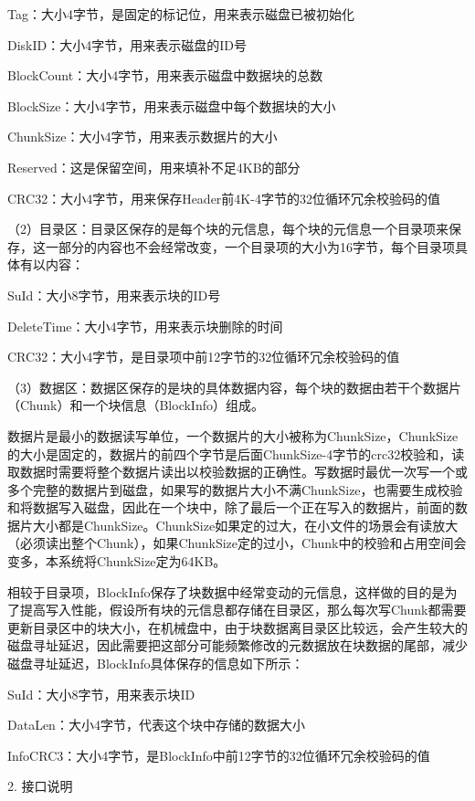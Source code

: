 Tag：大小4字节，是固定的标记位，用来表示磁盘已被初始化

DiskID：大小4字节，用来表示磁盘的ID号

BlockCount：大小4字节，用来表示磁盘中数据块的总数

BlockSize：大小4字节，用来表示磁盘中每个数据块的大小

ChunkSize：大小4字节，用来表示数据片的大小

Reserved：这是保留空间，用来填补不足4KB的部分

CRC32：大小4字节，用来保存Header前4K-4字节的32位循环冗余校验码的值

（2）目录区：目录区保存的是每个块的元信息，每个块的元信息一个目录项来保存，这一部分的内容也不会经常改变，一个目录项的大小为16字节，每个目录项具体有以内容：

SuId：大小8字节，用来表示块的ID号

DeleteTime：大小4字节，用来表示块删除的时间

CRC32：大小4字节，是目录项中前12字节的32位循环冗余校验码的值

（3）数据区：数据区保存的是块的具体数据内容，每个块的数据由若干个数据片（Chunk）和一个块信息（BlockInfo）组成。

数据片是最小的数据读写单位，一个数据片的大小被称为ChunkSize，ChunkSize的大小是固定的，数据片的前四个字节是后面ChunkSize-4字节的crc32校验和，读取数据时需要将整个数据片读出以校验数据的正确性。写数据时最优一次写一个或多个完整的数据片到磁盘，如果写的数据片大小不满ChunkSize，也需要生成校验和将数据写入磁盘，因此在一个块中，除了最后一个正在写入的数据片，前面的数据片大小都是ChunkSize。ChunkSize如果定的过大，在小文件的场景会有读放大（必须读出整个Chunk），如果ChunkSize定的过小，Chunk中的校验和占用空间会变多，本系统将ChunkSize定为64KB。

相较于目录项，BlockInfo保存了块数据中经常变动的元信息，这样做的目的是为了提高写入性能，假设所有块的元信息都存储在目录区，那么每次写Chunk都需要更新目录区中的块大小，在机械盘中，由于块数据离目录区比较远，会产生较大的磁盘寻址延迟，因此需要把这部分可能频繁修改的元数据放在块数据的尾部，减少磁盘寻址延迟，BlockInfo具体保存的信息如下所示：

SuId：大小8字节，用来表示块ID

DataLen：大小4字节，代表这个块中存储的数据大小

InfoCRC3：大小4字节，是BlockInfo中前12字节的32位循环冗余校验码的值

2. 接口说明

